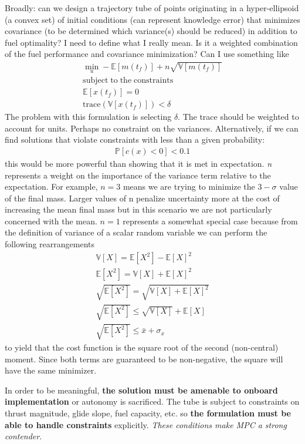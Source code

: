 \documentclass[10pt,a4paper]{article}
\begin{document}
	Broadly: can we design a trajectory tube of points originating in a hyper-ellipsoid (a convex set) of initial conditions (can represent knowledge error) that minimizes covariance (to be determined which variance(s) should be reduced) in addition to fuel optimality? I need to define what I really mean. Is it a weighted combination of the fuel performance and covariance minimization? Can I use something like 
	\begin{align}
	\min_u -\mathbb{E}[m(t_f)] + n\sqrt{\mathbb{V}[m(t_f)]} \\
	\mathrm{subject\; to\; the\; constraints}\nonumber \\
	\mathbb{E}[x(t_f)] = 0 \\
	\mathrm{trace}(\mathbb{V}[x(t_f)]) < \delta
	\end{align}
	The problem with this formulation is selecting $\delta$. The trace should be weighted to account for units. Perhaps no constraint on the variances. Alternatively, if we can find solutions that violate constraints with less than a given probability:
	\begin{align}
	\mathbb{P}[c(x)<0] < 0.1 
	\end{align}
	this would be more powerful than showing that it is met in expectation. \textit{n} represents a weight on the importance of the variance term relative to the expectation. For example, $n=3$ means we are trying to minimize the $3-\sigma$ value of the final mass. Larger values of n penalize uncertainty more at the cost of increasing the mean final mass but in this scenario we are not particularly concerned with the mean. $n=1$ represents a somewhat special case because from the definition of variance of a scalar random variable we can perform the following rearrangements
	\begin{align}
	\mathbb{V}[X] = \mathbb{E}[X^2] - \mathbb{E}[X]^2\\
	\mathbb{E}[X^2] = \mathbb{V}[X] + \mathbb{E}[X]^2\\
	\sqrt{\mathbb{E}[X^2]} = \sqrt{\mathbb{V}[X] + \mathbb{E}[X]^2}\\
	\sqrt{\mathbb{E}[X^2]} \le \sqrt{\mathbb{V}[X]} + \mathbb{E}[X]\\
	\sqrt{\mathbb{E}[X^2]} \le  \bar{x} + \sigma_x
	\end{align} 
	to yield that the cost function is the square root of the second (non-central) moment. Since both terms are guaranteed to be non-negative, the square will have the same minimizer.
	
	In order to be meaningful, \textbf{the solution must be amenable to onboard implementation} or autonomy is sacrificed. The tube is subject to constraints on thrust magnitude, glide slope, fuel capacity, etc. so \textbf{the formulation must be able to handle constraints} explicitly. \textit{These conditions make MPC a strong contender}.
	
\end{document}
